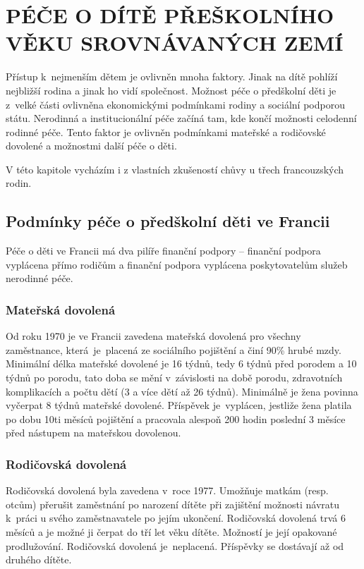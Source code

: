 \chapter{PÉČE O DÍTĚ PŘEŠKOLNÍHO VĚKU SROVNÁVANÝCH ZEMÍ}

	Přístup k nejmenším dětem je ovlivněn mnoha faktory. Jinak na dítě pohlíží nejbližší rodina a jinak ho vidí společnost. Možnost péče o předškolní děti je z velké části ovlivněna ekonomickými podmínkami rodiny a sociální podporou státu. Nerodinná a institucionální péče začíná tam, kde končí možnosti celodenní rodinné péče. Tento faktor je ovlivněn podmínkami mateřské a rodičovské dovolené a možnostmi další péče o děti.

	V této kapitole vycházím i z vlastních zkušeností chůvy u třech francouzských rodin. 

		\section{Podmínky péče o předškolní děti ve Francii}
		Péče o děti ve Francii má dva pilíře finanční podpory – finanční podpora vyplácena přímo rodičům a finanční podpora vyplácena poskytovatelům služeb nerodinné péče. 


			\subsection{Mateřská dovolená}
				Od roku 1970 je ve Francii zavedena mateřská dovolená pro všechny zaměstnance, která je placená ze sociálního pojištění a činí 90\% hrubé mzdy. Minimální délka mateřské dovolené je 16 týdnů, tedy 6 týdnů před porodem a 10 týdnů po porodu, tato doba se mění v závislosti na době porodu, zdravotních komplikacích a počtu dětí (3 a více dětí až 26 týdnů). Minimálně je žena povinna vyčerpat 8 týdnů mateřské dovolené. Příspěvek je vyplácen, jestliže žena platila po dobu 10ti měsíců pojištění a pracovala alespoň 200 hodin poslední 3 měsíce před nástupem na mateřskou dovolenou. \citep{Dennipece}

			\subsection{Rodičovská dovolená}
				Rodičovská dovolená byla zavedena v roce 1977. Umožňuje matkám (resp. otcům) přerušit zaměstnání po narození dítěte při zajištění možnosti návratu k práci u svého zaměstnavatele po jejím ukončení. Rodičovská dovolená trvá 6 měsíců a je možné ji čerpat do tří let věku dítěte. Možností je její opakované prodlužování. Rodičovská dovolená je neplacená. Příspěvky se dostávají až od druhého dítěte. 

